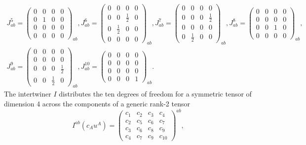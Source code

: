 \begin{equation}
\begin{gathered}
    J_{ab}^5 = \begin{pmatrix}0 & 0 & 0 & 0 \\ 0 & 1 & 0 & 0 \\ 0 & 0 & 0 & 0 \\ 0 & 0 & 0 & 0\end{pmatrix}_{ab}, J_{ab}^6 = \begin{pmatrix}0 & 0 & 0 & 0 \\ 0 & 0 & \frac{1}{2} & 0 \\ 0 & \frac{1}{2} & 0 & 0 \\ 0 & 0 & 0 & 0\end{pmatrix}_{ab}, J_{ab}^7 = \begin{pmatrix}0 & 0 & 0 & 0 \\ 0 & 0 & 0 & \frac{1}{2} \\ 0 & 0 & 0 & 0 \\ 0 & \frac{1}{2} & 0 & 0\end{pmatrix}_{ab}, J_{ab}^8 = \begin{pmatrix}0 & 0 & 0 & 0 \\ 0 & 0 & 0 & 0 \\ 0 & 0 & 1 & 0 \\ 0 & 0 & 0 & 0\end{pmatrix}_{ab}, \\
    J_{ab}^9 = \begin{pmatrix}0 & 0 & 0 & 0 \\ 0 & 0 & 0 & 0 \\ 0 & 0 & 0 & \frac{1}{2} \\ 0 & 0 & \frac{1}{2} & 0\end{pmatrix}_{ab}, J_{ab}^{10} = \begin{pmatrix}0 & 0 & 0 & 0 \\ 0 & 0 & 0 & 0 \\ 0 & 0 & 0 & 0 \\ 0 & 0 & 0 & 1\end{pmatrix}_{ab}.
  \end{gathered}
\end{equation}
The intertwiner $I$ distributes the ten degrees of freedom for a symmetric tensor of dimension 4 across the components of a generic rank-2 tensor
\begin{equation}
  I^{ab}(c_Au^A) = \begin{pmatrix} c_1 & c_2 & c_3 & c_4 \\ c_2 & c_5 & c_6 & c_7 \\ c_3 & c_6 & c_8 & c_9 \\ c_4 & c_7 & c_9 & c_{10}\end{pmatrix}^{ab},
\end{equation}
